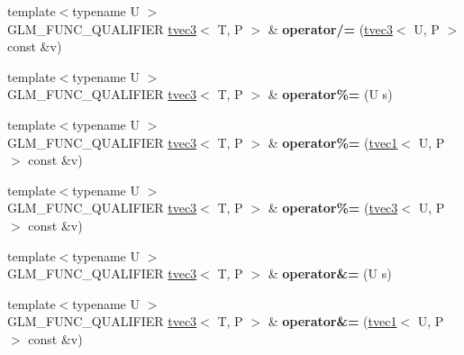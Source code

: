 \begin{DoxyCompactItemize}
\item 
\hypertarget{structglm_1_1tvec3_ad71db80da3ef78d0ac88533c9177ea77}{{\footnotesize template$<$typename U $>$ }\\G\-L\-M\-\_\-\-F\-U\-N\-C\-\_\-\-Q\-U\-A\-L\-I\-F\-I\-E\-R \hyperlink{structglm_1_1tvec3}{tvec3}$<$ T, P $>$ \& {\bfseries operator/=} (\hyperlink{structglm_1_1tvec3}{tvec3}$<$ U, P $>$ const \&v)}\label{structglm_1_1tvec3_ad71db80da3ef78d0ac88533c9177ea77}

\item 
\hypertarget{structglm_1_1tvec3_a4afce256625b2191c253ce41533a88a8}{{\footnotesize template$<$typename U $>$ }\\G\-L\-M\-\_\-\-F\-U\-N\-C\-\_\-\-Q\-U\-A\-L\-I\-F\-I\-E\-R \hyperlink{structglm_1_1tvec3}{tvec3}$<$ T, P $>$ \& {\bfseries operator\%=} (U s)}\label{structglm_1_1tvec3_a4afce256625b2191c253ce41533a88a8}

\item 
\hypertarget{structglm_1_1tvec3_aea61db59d6e74810ebdd814c44d0c7d2}{{\footnotesize template$<$typename U $>$ }\\G\-L\-M\-\_\-\-F\-U\-N\-C\-\_\-\-Q\-U\-A\-L\-I\-F\-I\-E\-R \hyperlink{structglm_1_1tvec3}{tvec3}$<$ T, P $>$ \& {\bfseries operator\%=} (\hyperlink{structglm_1_1tvec1}{tvec1}$<$ U, P $>$ const \&v)}\label{structglm_1_1tvec3_aea61db59d6e74810ebdd814c44d0c7d2}

\item 
\hypertarget{structglm_1_1tvec3_a4a0e1e225a1525d06c194dec0e966b67}{{\footnotesize template$<$typename U $>$ }\\G\-L\-M\-\_\-\-F\-U\-N\-C\-\_\-\-Q\-U\-A\-L\-I\-F\-I\-E\-R \hyperlink{structglm_1_1tvec3}{tvec3}$<$ T, P $>$ \& {\bfseries operator\%=} (\hyperlink{structglm_1_1tvec3}{tvec3}$<$ U, P $>$ const \&v)}\label{structglm_1_1tvec3_a4a0e1e225a1525d06c194dec0e966b67}

\item 
\hypertarget{structglm_1_1tvec3_aee46aea396dbbee84a0e35f41864ddfb}{{\footnotesize template$<$typename U $>$ }\\G\-L\-M\-\_\-\-F\-U\-N\-C\-\_\-\-Q\-U\-A\-L\-I\-F\-I\-E\-R \hyperlink{structglm_1_1tvec3}{tvec3}$<$ T, P $>$ \& {\bfseries operator\&=} (U s)}\label{structglm_1_1tvec3_aee46aea396dbbee84a0e35f41864ddfb}

\item 
\hypertarget{structglm_1_1tvec3_a2553d75c1533a163ed6526f903e8a061}{{\footnotesize template$<$typename U $>$ }\\G\-L\-M\-\_\-\-F\-U\-N\-C\-\_\-\-Q\-U\-A\-L\-I\-F\-I\-E\-R \hyperlink{structglm_1_1tvec3}{tvec3}$<$ T, P $>$ \& {\bfseries operator\&=} (\hyperlink{structglm_1_1tvec1}{tvec1}$<$ U, P $>$ const \&v)}\label{structglm_1_1tvec3_a2553d75c1533a163ed6526f903e8a061}


\end{DoxyCompactItemize}
